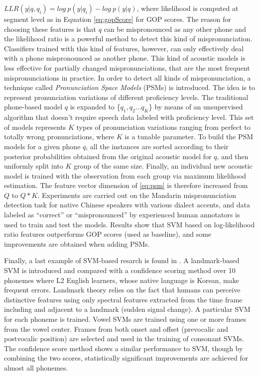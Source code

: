 $LLR(y|q,q_{i})=log \ p(y|q_{i}) - log \ p(y|q)$, where likelihood is computed at segment
level as in Equation \ref{eq:gopScore} for GOP scores. The reason for choosing these features is
that $q$ can be mispronounced as any other phone and the likelihood ratio is a powerful
method to detect this kind of mispronunciation. Classifiers trained with this kind of features, however, 
can only effectively deal with a phone mispronounced as another phone. This kind of acoustic models is 
less effective for partially changed mispronunciations, that are the most frequent mispronunciations
in practice. In order to detect all kinds of mispronunciation, a technique called  
\textit{Pronunciation Space Models} (PSMs) is introduced. The idea is to represent pronunciation variations
of different proficiency levels. The traditional phone-based model $q$ is expanded to 
\{$q_{1}, q_{2} \dotsc q_{K}$\} by means of an unsupervised algorithm that doesn't require
speech data labeled with proficiency level. 
This set of models represents $K$ types of pronunciation variations ranging from perfect to
totally wrong pronunciations, where $K$ is a tunable parameter. To build the PSM models for a
given phone $q$, all the instances are sorted according to their 
posterior probabilities obtained from the original acoustic model for $q$, and
then uniformly split into $K$ group of the same size. Finally, an individual new acoustic
model is trained with the observation from each group via maximum likelihood estimation.
The feature vector dimension of \ref{eq:psm} is therefore increased from $Q$ to $Q*K$.
Experiments are carried out on the 
Mandarin mispronunciation detection task for native Chinese speakers with various dialect accents, 
and data labeled as ``correct'' or ``mispronounced'' by experienced human annotators is used to train and test the models.
Results show that SVM based on log-likelihood ratio features outperforms GOP scores (used as baseline), and some
improvements are obtained when adding PSMs.

Finally, a last example of SVM-based resarch is found in \cite{landmark_svm, landmark_svm_2}. 
A landmark-based SVM is introduced and compared with a confidence 
scoring method over 10 phonemes where 
L2 English learners, whose native language is Korean, make frequent errors. 
Landmark theory relies on the fact that humans can perceive distinctive
features using only spectral features extracted from the time frame including and adjacent to
a landmark (sudden signal change). A particular SVM for each phoneme is trained. Vowel SVMs are 
trained using one or more frames from the vowel center. Frames from both onset and offset
(prevocalic and postvocalic position) are selected and used in the training of consonant
SVMs. The confidence score method shows a similar performance to SVM, though by combining 
the two scores, statistically significant improvements are achieved for almost all phonemes.

